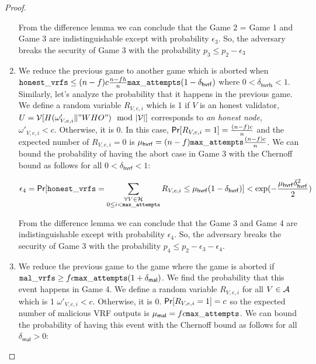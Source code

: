 \begin{proof}
\begin{enumerate}[label={{Game }}{{\arabic*}}]
	From the difference lemma we can conclude that the Game 2 = Game 1 and Game 3 are indistinguishable except with probability $ \epsilon_3 $. So, the adversary breaks the security of Game 3 with the probability $ p_3 \leq  p_2 - \epsilon_3 $
	
	
	\item We reduce the previous game to another game which is aborted when $ \mathtt{honest\_vrfs} \leq (n-f)c \frac{n-fh}{n} \mathtt{max\_attempts} (1- \delta_{\mathsf{hvrf}}) $ where $ 0 < \delta_{\mathsf{hvrfs}} < 1 $. Similarly, let's analyze the probability that it happens in the previous game. We define a random variable $ R_{V,e,i} $ which is 1 if $ V $ is an honest validator, $ U = \mathcal{V}[H(\omega'_{V,e,i} \| "WHO") \mod |\mathcal{V}|]  $ corresponds to  \emph{an honest node}, $ \omega'_{V,e,i} < c $. Otherwise, it is 0.  In this case, $ \mathsf{Pr}[R_{V,e,i} = 1] = \frac{(n-f)c}{n}$ and
	the expected number of $ R_{V,e,i}  = 0$ is  $ \mu_{\mathsf{hvrf}} = (n-f) \mathtt{max\_attempts} \frac{(n-f)c}{n} $. We can bound the probability of having the abort case in Game 3 with the Chernoff bound as follows for all $ 0 <\delta_{\mathsf{hvrf}} < 1 	 $:
	
	\begin{equation}\label{eq:beforeepcoh}
	\epsilon_4 = \mathsf{Pr}[ \mathtt{honest\_vrfs} = \sum_{\substack{ \forall V \in \mathcal{H} \\0\leq i < \mathtt{max\_attempts}}} R_{V,e,i} \leq \mu_{\mathsf{hvrf}} (1 - \delta_{\mathsf{hvrf}})] < \exp(-\frac{\mu_{\mathsf{hvrf}}\delta_{\mathsf{hvrf}}^2}{2}) \nonumber
	\end{equation}
	
	From the difference lemma we can conclude that the Game 3 and Game 4 are indistinguishable except with probability $ \epsilon_4 $. So, the adversary breaks the security of Game 3 with the probability $ p_4 \leq p_2 - \epsilon_3  - \epsilon_4$.       
	
	\item We reduce the previous game to the game where the game is aborted if $ \mathtt{mal\_vrfs} \geq fc \mathtt{max\_attempts} (1+\delta_{\mathsf{mal}}) $. We find the probability that this event happens in Game 4.
	We define a random variable $ R_{V,e,i} $ for all $ V \in \mathcal{A} $ which is 1 $ \omega'_{V,e,i} < c $. Otherwise, it is 0.  $ \mathsf{Pr}[R_{V,e,i} = 1] = c $ so the expected number of malicious VRF outputs  is $ \mu_{\mathsf{mal}} = fc\mathtt{max\_attempts}  $. We can bound the probability of having this event with the Chernoff bound as follows for all $ \delta_{\mathsf{mal}} > 0 	 $:
	

\end{enumerate}
\end{proof}
